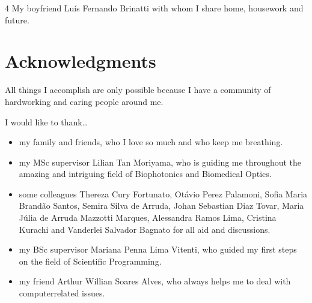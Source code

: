 \documentclass[letterpaper,10pt,english]{sphinxmanual}
\begin{document}
\begin{DUlineblock}{0em}
\item[] 4\sphinxhyphen{} My boyfriend Luís Fernando Brinatti with whom I share home, housework and future.
\end{DUlineblock}


\chapter{Acknowledgments}
\label{\detokenize{index:acknowledgments}}
\sphinxAtStartPar
All things I accomplish are only possible because I have a community of hard\sphinxhyphen{}working and caring people around me.

\sphinxAtStartPar
I would like to thank…
\begin{itemize}
\item {} 
\sphinxAtStartPar
my family and friends, who I love so much and who keep me breathing.

\item {} 
\sphinxAtStartPar
my MSc supervisor Lilian Tan Moriyama, who is guiding me throughout the amazing and intriguing field of Biophotonics and Biomedical Optics.

\item {} 
\sphinxAtStartPar
some colleagues Thereza Cury Fortunato, Otávio Perez Palamoni, Sofia Maria Brandão Santos, Semira Silva de Arruda, Johan Sebastian Diaz Tovar, Maria Júlia de Arruda Mazzotti Marques, Alessandra Ramos Lima, Cristina Kurachi and Vanderlei Salvador Bagnato for all aid and discussions.

\item {} 
\sphinxAtStartPar
my BSc supervisor Mariana Penna Lima Vitenti, who guided my first steps on the field of Scientific Programming.

\item {} 
\sphinxAtStartPar
my friend Arthur Willian Soares Alves, who always helps me to deal with computer\sphinxhyphen{}related issues.

\end{itemize}
\end{document}
